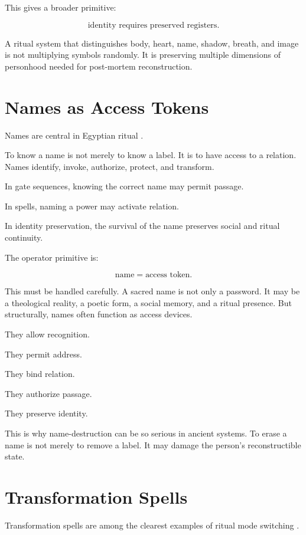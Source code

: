 \documentclass[11pt]{book}
\begin{document}
This gives a broader primitive:

\[
\text{identity requires preserved registers}.
\]

A ritual system that distinguishes body, heart, name, shadow, breath, and image is not multiplying symbols randomly. It is preserving multiple dimensions of personhood needed for post-mortem reconstruction.

\section{Names as Access Tokens}

Names are central in Egyptian ritual \cite{Allen1974BookDead,Pinch1994MagicEgypt,Assmann2005DeathSalvation}.

To know a name is not merely to know a label. It is to have access to a relation. Names identify, invoke, authorize, protect, and transform.

In gate sequences, knowing the correct name may permit passage.

In spells, naming a power may activate relation.

In identity preservation, the survival of the name preserves social and ritual continuity.

The operator primitive is:

\[
\text{name} = \text{access token}.
\]

This must be handled carefully. A sacred name is not only a password. It may be a theological reality, a poetic form, a social memory, and a ritual presence. But structurally, names often function as access devices.

They allow recognition.

They permit address.

They bind relation.

They authorize passage.

They preserve identity.

This is why name-destruction can be so serious in ancient systems. To erase a name is not merely to remove a label. It may damage the person's reconstructible state.

\section{Transformation Spells}

Transformation spells are among the clearest examples of ritual mode switching \cite{Allen1974BookDead,Faulkner1972BookDead}.
\end{document}
